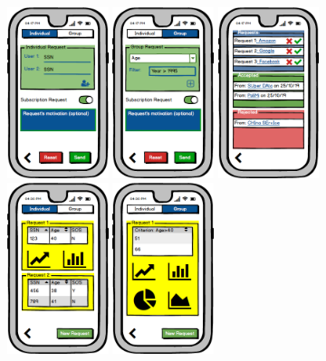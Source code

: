 \documentclass[a4paper]{article}
\begin{document}
        \begin{figure}[!htpb]

    	\centering
    	\includegraphics[height=50mm]{images/mockups/Requests.png}
    	\includegraphics[height=50mm]{images/mockups/GroupRequest.png}
    	\includegraphics[height=50mm]{images/mockups/ManageRequests.png}
    	\includegraphics[height=50mm]{images/mockups/ViewData.png}
    	\includegraphics[height=50mm]{images/mockups/ViewData2.png}
    	\newline
        \end{figure}
        
\end{document}
